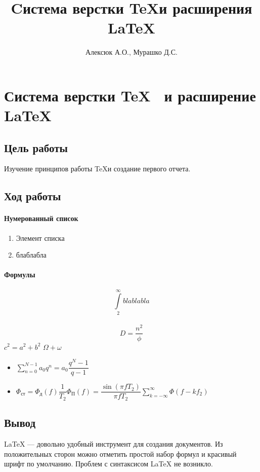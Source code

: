 \documentclass[10pt,a4paper]{article}
\author{Алексюк А.О., Мурашко Д.С.}
\title{Cистема верстки \TeX и расширения \LaTeX}
\begin{document}
\maketitle
\tableofcontents
\pagebreak
\section{Система верстки \TeX~ и расширение \LaTeX}
\subsection{Цель работы}
Изучение принципов работы \TeX и создание первого отчета.
\subsection{Ход работы}
\paragraph{Нумерованный список}
\begin{enumerate}
\item Элемент списка
\item блаблабла
\end{enumerate}
\paragraph{Формулы}
$$\int\limits_2^{\infty} blablabla$$
\\
$$D = \frac{n^2}{\phi}$$
\hspace{10cm} $c^2=a^2+b^2$
$\Omega + 
\omega$
\begin{itemize}
\item $\sum\limits_{n=0}^{N-1} a_0 q^n = a_0 \dfrac{q^N-1}{q-1}$

\item $\Phi_\text{ст} = \Phi_\text{д}(f) \dfrac{1}{T_2} \Phi_\text{П}(f) = \dfrac{\sin(\pi f T_2)}{\pi f T_2} \sum\limits_{k=-\infty}^{\infty} \Phi (f - k f_2)$
\end{itemize}
\subsection{Вывод}
\LaTeX{} --- довольно удобный инструмент для создания документов. Из положительных сторон можно отметить простой набор формул и красивый шрифт по умолчанию. Проблем с синтаксисом \LaTeX{} не возникло.
\end{document}
